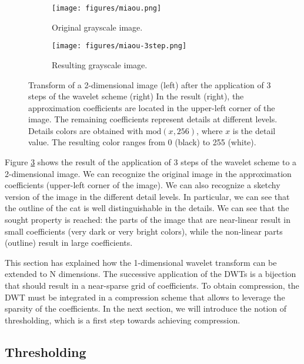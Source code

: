 \begin{figure}[htbp]
    \centering
    \begin{subfigure}[b]{0.44\textwidth}
        \texttt{[image: figures/miaou.png]}
        \caption{Original grayscale image.}
        \label{fig:miaou}
    \end{subfigure}
    \begin{subfigure}[b]{0.44\textwidth}
        \texttt{[image: figures/miaou-3step.png]}
        \caption{Resulting grayscale image.}
        \label{fig:miaou-3step}
    \end{subfigure}
    \caption{Transform of a 2-dimensional image (left) after the application of 3 steps of the wavelet scheme (right)
    In the result (right), the approximation coefficients are located in the upper-left corner of the image.
    The remaining coefficients represent details at different levels.
    Details colors are obtained with $\text{mod}(x,256)$, where $x$ is the detail value.
    The resulting color ranges from 0 (black) to 255 (white).}
    \label{fig:miaou-2d}
\end{figure}

Figure \ref{fig:miaou-2d} shows the result of the application of 3 steps of the wavelet scheme to a 2-dimensional image.
We can recognize the original image in the approximation coefficients (upper-left corner of the image).
We can also recognize a sketchy version of the image in the different detail levels.
In particular, we can see that the outline of the cat is well distinguishable in the details.
We can see that the sought property is reached: the parts of the image that are near-linear result in small coefficients (very dark or very bright colors), while the non-linear parts (outline) result in large coefficients.

This section has explained how the 1-dimensional wavelet transform can be extended to N dimensions.
The successive application of the DWTs is a bijection that should result in a near-sparse grid of coefficients.
To obtain compression, the DWT must be integrated in a compression scheme that allows to leverage the sparsity of the coefficients.
In the next section, we will introduce the notion of thresholding, which is a first step towards achieving compression.

\subsection{Thresholding} \label{sec:thresholding}

